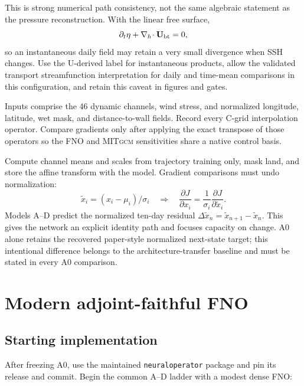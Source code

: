 \documentclass[11pt]{article}
\newcommand{\MITgcm}{\textsc{MITgcm}}
\begin{document}
This is strong numerical path consistency, not the same algebraic statement as the
pressure reconstruction.  With the linear free surface,
\[
\partial_t\eta+\nabla_h\!\cdot\mathbf U_{\rm bt}=0,
\]
so an instantaneous daily field may retain a very small divergence when SSH changes.
Use the U-derived label for instantaneous products, allow the validated transport
streamfunction interpretation for daily and time-mean comparisons in this
configuration, and retain this caveat in figures and gates.

Inputs comprise the 46 dynamic channels, wind stress, and normalized longitude, latitude,
wet mask, and distance-to-wall fields. Record every C-grid interpolation operator.
Compare gradients only after applying the exact transpose of those operators so the FNO
and \MITgcm{} sensitivities share a native control basis.

Compute channel means and scales from trajectory training only, mask land, and store the
affine transform with the model. Gradient comparisons must undo normalization:
\[
\widetilde{x}_i=(x_i-\mu_i)/\sigma_i
\quad\Longrightarrow\quad
\frac{\partial J}{\partial x_i}
=\frac{1}{\sigma_i}\frac{\partial J}{\partial\widetilde{x}_i}.
\]
Models A--D predict the normalized ten-day residual
\(\Delta\widetilde{x}_n=\widetilde{x}_{n+1}-\widetilde{x}_n\). This gives the
network an explicit identity path and focuses capacity on change. A0 alone retains the
recovered paper-style normalized next-state target; this intentional difference belongs
to the architecture-transfer baseline and must be stated in every A0 comparison.

\section{Modern adjoint-faithful FNO}
\subsection{Starting implementation}
After freezing A0, use the maintained \texttt{neuraloperator} package and pin its release
and commit. Begin the common A--D ladder with a modest dense FNO:
\end{document}
